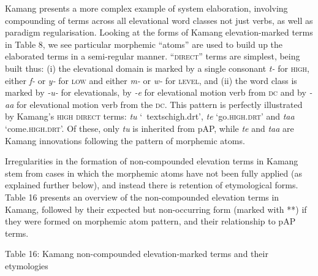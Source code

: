 Kamang presents a more complex example of system elaboration, involving compounding of terms across all elevational word classes not just verbs, as well as paradigm regularisation. Looking at the forms of Kamang elevation-marked terms in Table 8, we see particular morphemic {\textquotedblleft}atoms{\textquotedblright} are used to build up the elaborated terms in a semi-regular manner. {\textquotedblleft}\textsc{direct}{\textquotedblright} terms are simplest, being built thus: (i) the elevational domain is marked by a single consonant \textit{t-} for \textsc{high}, either \textit{f-} or \textit{y-} for \textsc{low} and either\textit{ m-} or \textit{w-} for \textsc{level}, and (ii) the word class is marked by \textit{{}-u-{\ng}} for elevationals, by \textit{{}-e} for elevational motion verb from \textsc{dc} and by \textit{{}-aa{\ng} }for elevational motion verb from the \textsc{dc}. This pattern is perfectly illustrated by Kamang{\textquoteright}s \textsc{high direct} terms: \textit{tu{\ng}} {\textquoteleft}\
textsc{high.drt{\textquoteright}}, \textit{te} {\textquoteleft}go.\textsc{high.drt{\textquoteright}} and \textit{taa{\ng}} {\textquoteleft}come.\textsc{high.drt{\textquoteright}.  O}f these, only \textit{tu{\ng}} is inherited from pAP, while\textsc{ }\textit{te} and \textit{taa{\ng}} are Kamang innovations following the pattern of morphemic atoms. 

Irregularities in the formation of non-compounded elevation terms in Kamang stem from cases in which the morphemic atoms have not been fully applied (as explained further below), and instead there is retention of etymological forms. Table 16 presents an overview of the non-compounded elevation terms in Kamang, followed by their expected but non-occurring form (marked with **) if they were formed on morphemic atom pattern, and their relationship to pAP terms.

{\centering
Table 16: Kamang non-compounded elevation-marked terms and their etymologies
\par}

